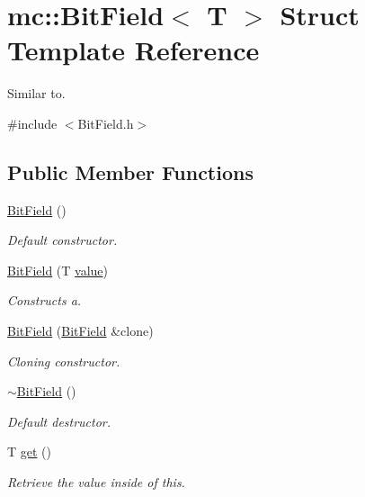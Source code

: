 \hypertarget{structmc_1_1_bit_field}{}\section{mc\+:\+:Bit\+Field$<$ T $>$ Struct Template Reference}
\label{structmc_1_1_bit_field}


Similar to.  




{\ttfamily \#include $<$Bit\+Field.\+h$>$}

\subsection*{Public Member Functions}
\begin{DoxyCompactItemize}
\item 
\hyperlink{structmc_1_1_bit_field_a7b4b827b8d03ce159039515f181e7897}{Bit\+Field} ()
\begin{DoxyCompactList}\small\item\em Default constructor. \end{DoxyCompactList}\item 
\hyperlink{structmc_1_1_bit_field_a02999c42a220b488e77e390e10ba1804}{Bit\+Field} (T \hyperlink{structmc_1_1_bit_field_ac4a96f98afd87fe71a7ad7c288e9e7d6}{value})
\begin{DoxyCompactList}\small\item\em Constructs a. \end{DoxyCompactList}\item 
\hyperlink{structmc_1_1_bit_field_a47e7d0ee9dcf58724327d8746e0cfa99}{Bit\+Field} (\hyperlink{structmc_1_1_bit_field}{Bit\+Field} \&clone)
\begin{DoxyCompactList}\small\item\em Cloning constructor. \end{DoxyCompactList}\item 
\hyperlink{structmc_1_1_bit_field_a839d6de6ad86a47af3e6a06a5cb96fc7}{$\sim$\+Bit\+Field} ()
\begin{DoxyCompactList}\small\item\em Default destructor. \end{DoxyCompactList}\item 
T \hyperlink{structmc_1_1_bit_field_aaac2bdffaa2cf5fcdaa93d783e53c174}{get} ()
\begin{DoxyCompactList}\small\item\em Retrieve the value inside of this. \end{DoxyCompactList}\item 

\end{DoxyCompactItemize}
